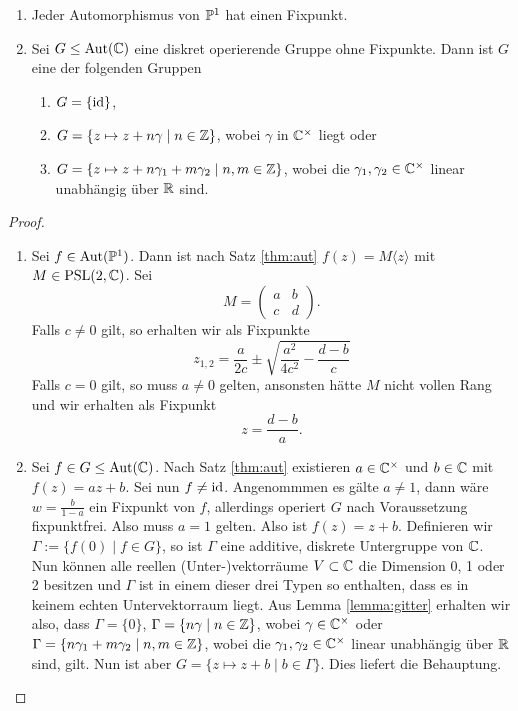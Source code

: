 \begin{lemma}
  \label{lemma:deck-pc}
  \begin{enumerate}
  \item Jeder Automorphismus von $\P^1$ hat einen Fixpunkt.
  \item Sei $G \leq \Aut(\C)$ eine diskret operierende Gruppe ohne
    Fixpunkte. Dann ist $G$ eine der folgenden Gruppen
    \begin{enumerate}
    \item $G = \{\id\}$,
    \item $G = \{ z \mapsto z + n \gamma \mid n \in \Z\}$, wobei
      $\gamma$ in $\C^\times$ liegt oder
    \item $G = \{z \mapsto z + n \gamma_1 + m \gamma_2 \mid n,m \in
      \Z\}$, wobei die $\gamma_1, \gamma_2 \in \C^\times$ linear
      unabhängig über $\R$ sind.
    \end{enumerate}
  \end{enumerate}
\end{lemma}

\begin{proof}
  \begin{enumerate}
  \item Sei $f \in \Aut(\P^1)$. Dann ist nach Satz \ref{thm:aut} $f(z) = M\langle z \rangle$ mit $M
    \in \PSL(2, \C)$. Sei
    \[
    M =
    \begin{pmatrix}
      a & b \\
      c & d
    \end{pmatrix}.
    \]
    Falls $c \neq 0$ gilt, so erhalten wir als Fixpunkte
    \[
    z_{1,2} = \frac{a}{2c} \pm \sqrt{\frac{a^2}{4 c^2} - \frac{d-b}{c}}
    \]
    Falls $c = 0$ gilt, so muss $a \neq 0$ gelten, ansonsten hätte $M$ nicht
    vollen Rang und wir erhalten als Fixpunkt
    \[
    z = \frac{d-b}{a}.
    \]
  \item Sei $f \in G \leq \Aut(\C)$. Nach Satz \ref{thm:aut}
    existieren $a \in \C^\times$ und $b \in \C$ mit $f(z) = az
    +b$. Sei nun $f \neq \id$. Angenommmen es gälte $a \neq 1$, dann
    wäre $w = \frac{b}{1-a}$ ein Fixpunkt von $f$, allerdings operiert
    $G$ nach Voraussetzung fixpunktfrei. Also muss $a = 1$
    gelten. Also ist $f(z) = z + b$. Definieren wir $\Gamma := \{f(0) \mid
    f \in G\}$, so ist $\Gamma$ eine additive, diskrete Untergruppe
    von $\C$. Nun können alle reellen (Unter-)vektorräume $V \subset
    \C$ die Dimension 0, 1 oder 2 besitzen und $\Gamma$ ist in einem
    dieser drei Typen so enthalten, dass es in keinem echten
    Untervektorraum liegt. Aus Lemma \ref{lemma:gitter} erhalten wir
    also, dass $\Gamma = \{0\}$, $\Gamma = \{ n \gamma \mid n \in \Z\}$,
    wobei $\gamma \in \C^\times$ oder $\Gamma = \{n \gamma_1 + m
    \gamma_2 \mid n,m \in \Z \}$, wobei die $\gamma_1, \gamma_2 \in
    \C^\times$ linear unabhängig über $\R$ sind, gilt. Nun ist aber $G
    = \{z \mapsto z + b \mid b \in \Gamma \}$. Dies liefert die Behauptung.
  \end{enumerate}
\end{proof}

